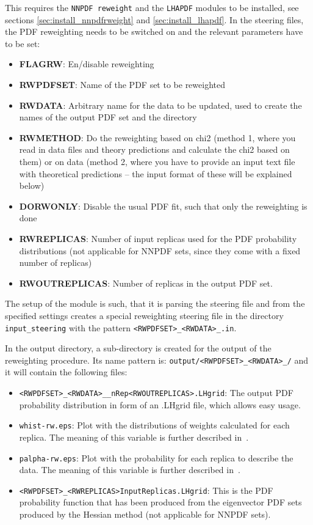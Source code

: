 This requires the {\tt NNPDF reweight} and the {\tt LHAPDF} modules to be installed, see sections \ref{sec:install_nnpdfrweight} and \ref{sec:install_lhapdf}. In the \fitter steering files, the PDF reweighting needs to be switched on and the relevant parameters have to be set: 

\begin{itemize}
 \item \textbf{FLAGRW}: En/disable reweighting
 \item \textbf{RWPDFSET}: Name of the PDF set to be reweighted
 \item \textbf{RWDATA}: Arbitrary name for the data to be updated, used to create the names of the output PDF set and the directory
 \item \textbf{RWMETHOD}: Do the reweighting based on chi2 (method 1, where you read in \fitter data files and theory predictions and calculate the chi2 based on them) or on data (method 2, where you have to provide an input text file with theoretical predictions {--} the input format of these will be explained below)
 \item \textbf{DORWONLY}: Disable the usual PDF fit, such that only the reweighting is done 
 \item \textbf{RWREPLICAS}: Number of input replicas used for the PDF probability distributions (not applicable for NNPDF sets, since they come with a fixed number of replicas)
 \item \textbf{RWOUTREPLICAS}: Number of replicas in the output PDF set.
\end{itemize}

The setup of the module is such, that it is parsing the \fitter steering file and from the specified settings creates a special reweighting steering file in the directory {\tt input\_steering} with the pattern {\tt <RWPDFSET>\_<RWDATA>\_<RWMETHOD: chi2 or data>.in}. 

In the output directory, a sub-directory is created for the output of the reweighting procedure. Its name pattern is: {\tt output/<RWPDFSET>\_<RWDATA>\_<RWMETHOD: chi2 or data>/} and it will contain the following files:

\begin{itemize}
 \item {\tt <RWPDFSET>\_<RWDATA>\_<RWMETHOD: chi2 or data>\_nRep<RWOUTREPLICAS>.LHgrid}: The output PDF probability distribution in form of an .LHgrid file, which allows easy usage.
 \item {\tt whist-rw.eps}: Plot with the distributions of weights calculated for each replica. The meaning of this variable is further described in~\cite{Ball:2011gg,Ball:2010gb}.
 \item {\tt palpha-rw.eps}: Plot with the probability for each replica to describe the data. The meaning of this variable is further described in~\cite{Ball:2011gg,Ball:2010gb}.
 \item {\tt <RWPDFSET>\_<RWREPLICAS>InputReplicas.LHgrid}: This is the PDF probability function that has been produced from the eigenvector PDF sets produced by the Hessian method (not applicable for NNPDF sets).
\end{itemize}

